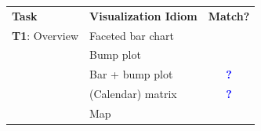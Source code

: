 \documentclass[journal]{vgtc}                %
\newcommand*\mismatch{\textcolor{red}{\ding{54}}}
\newcommand*\posmatch{\textcolor{blue}{{\bf ?}}}
\begin{document}
\begin{table}[ht]\renewcommand{\arraystretch}{1.2}\addtolength{\tabcolsep}{-1pt}
    \begin{center}
    \scriptsize
    \begin{tabular}{l|l|c}

        \rowcolor{blue!15}
    
        {\bf Task} & {\bf Visualization Idiom} & {\bf Match?}
        
        \\
        
        {\bf T1}: Overview 
        
        & Faceted bar chart 
        
        & \mismatch
        
        \\
        
        \rowcolor{gray!15}
        
        
        & Bump plot 
        
        & \mismatch
        
        \\
        
        
        & Bar + bump plot 
        
        & \posmatch
        
        \\
        
        \rowcolor{gray!15}

        
        & (Calendar) matrix 
        
        & \posmatch
        
        \\
        
        
        & Map 
        
        & \mismatch
        
        \\
        

\end{tabular}
\end{center}
\end{table}
\end{document}
